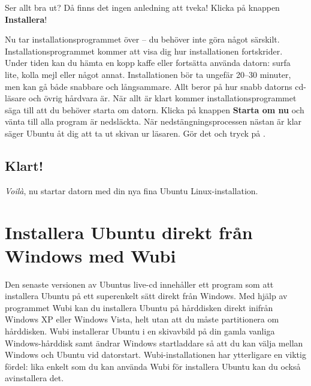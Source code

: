 \documentclass[a4paper,final]{memoir} %
\begin{document}
Ser allt bra ut? Då finns det ingen anledning att tveka! Klicka på knappen \textbf{Installera}!

Nu tar installationsprogrammet över -- du behöver inte göra något särskilt. Installationsprogrammet kommer att visa dig hur installationen fortskrider. Under tiden kan du hämta en kopp kaffe eller fortsätta använda datorn: surfa lite, kolla mejl eller något annat. Installationen bör ta ungefär 20--30 minuter, men kan gå både snabbare och långsammare. Allt beror på hur snabb datorns cd-läsare och övrig hårdvara är. När allt är klart kommer installationsprogrammet säga till att du behöver starta om datorn. Klicka på knappen \textbf{Starta om nu} och vänta till alla program är nedsläckta. När nedstängningsprocessen nästan är klar säger Ubuntu åt dig att ta ut skivan ur läsaren. Gör det och tryck på \xenter{}.

\subsection{Klart!}


\textit{Voilà}, nu startar datorn med din nya fina Ubuntu Linux-installation.  




\section{Installera Ubuntu direkt från Windows med Wubi}


Den senaste versionen av Ubuntus live-cd innehåller ett program som att installera Ubuntu på ett superenkelt sätt direkt från Windows. Med hjälp av programmet Wubi kan du installera Ubuntu på hårddisken direkt inifrån Windows XP eller Windows Vista, helt utan att du måste partitionera om hårddisken. Wubi installerar Ubuntu i en skivavbild på din gamla vanliga Windows-hårddisk samt ändrar Windows startladdare så att du kan välja mellan Windows och Ubuntu vid datorstart. Wubi-installationen har ytterligare en viktig fördel: lika enkelt som du kan använda Wubi för installera Ubuntu kan du också avinstallera det. 
\end{document}
